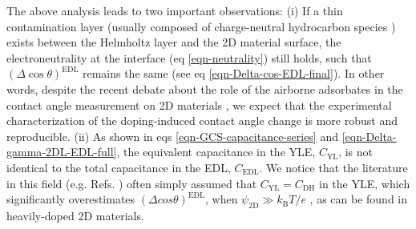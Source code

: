 \documentclass[journal=jacsat,manuscript=article,email=true,hyperref=true,keywords=true]{achemso}
\begin{document}
The above analysis leads to two important observations: (i) If a thin
contamination layer (usually composed of charge-neutral hydrocarbon
species \cite{li_effect_2013}) exists between the Helmholtz layer and
the 2D material surface, the electroneutrality at the interface (eq
\ref{eqn-neutrality}) still holds, such that \((\Delta \cos
\theta)^{\mathrm{EDL}}\) remains the same (see eq
\ref{eqn-Delta-cos-EDL-final}). In other words, despite the recent
debate about the role of the airborne adsorbates in the contact angle
measurement on 2D materials
\cite{li_effect_2013,Kozbial_2015,Xu_2013_withwhat,Chow_2015}, we expect
that the experimental characterization of the doping-induced contact
angle change is more robust and reproducible. (ii) As shown in eqs
\ref{eqn-GCS-capacitance-series} and \ref{eqn-Delta-gamma-2DL-EDL-full},
the equivalent capacitance in the YLE, \(C_{\mathrm{YL}}\), is not
identical to the total capacitance in the EDL, \(C_{\mathrm{EDL}}\). We
notice that the literature in this field (e.g. Refs.
)
often simply assumed that \(C_{\mathrm{YL}}=C_{\mathrm{DH}}\) in the
YLE, which significantly overestimates \((\Delta cos
\theta)^{\mathrm{EDL}}\), when \(\psi_{\mathrm{2D}} \gg
k_{\mathrm{B}}T/e\) \cite{israelachvili03_inter}, as can be found in heavily-doped 2D materials. 
\end{document}

